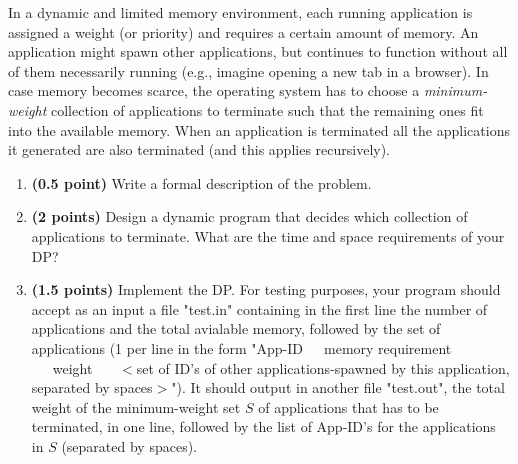 \documentclass{article}
\begin{document}
\medskip

In a dynamic and limited memory environment, each running application is assigned a weight (or priority) and requires a certain amount of memory. An application might spawn other applications, but continues to function without all of them necessarily running (e.g., imagine opening a new tab in a browser). In case memory becomes scarce, the operating system has to choose a {\it minimum-weight} collection of applications to terminate such that the remaining ones fit into the available memory.  When an application is terminated all the applications it generated are also terminated (and this applies recursively). 
\begin{enumerate}
\item \textbf{(0.5 point)} Write a formal description of the problem.
\item \textbf{(2 points)} Design a  dynamic program that decides which collection of applications to terminate. What are the time and space requirements of your DP?
\item \textbf{(1.5 points)} Implement the DP. For testing purposes, your program should accept as an input a file "test.in" containing in the first line the number of applications and the total avialable memory, followed by the set of applications (1 per line in the form "App-ID\ \ \ memory requirement \ \ \ weight \ \ \ $<$set of ID's of other applications-spawned by this application, separated by spaces$>$"). It should output in another file "test.out", the total weight of the minimum-weight set $S$ of applications that has to be terminated, in one line, followed by the list of App-ID's for the applications in $S$ (separated by spaces).
\end{enumerate}
\end{document}
